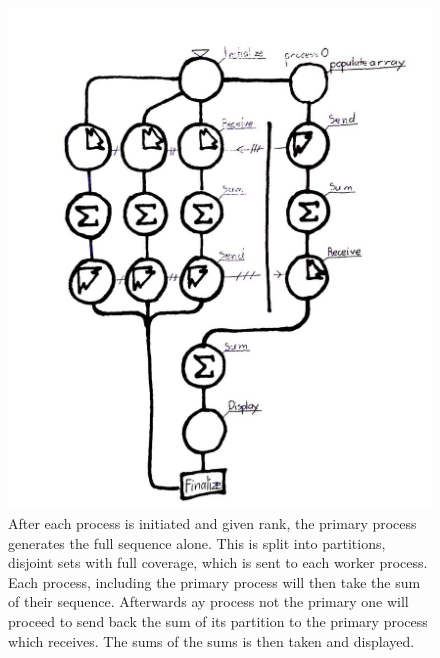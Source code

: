 \begin{figure}
\includegraphics[width=\textwidth]{flytskjema1}
\caption{After each process is initiated and given rank, the primary process generates the full sequence alone. This is split into partitions, disjoint sets with full coverage, which is sent to each worker process. Each process, including the primary process will then take the sum of their sequence. Afterwards ay process not the primary one will proceed to send back the sum of its partition to the primary process which receives. The sums of the sums is then taken and displayed. }
\end{figure}
